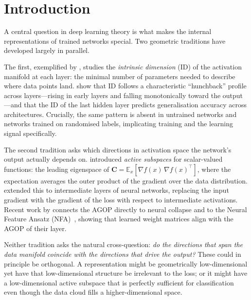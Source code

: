 \documentclass{article}
\newcommand{\E}{\mathbb{E}}
\newcommand{\AGOP}{\mathbf{C}}          %
\begin{document}
\section{Introduction}
\label{sec:intro}

A central question in deep learning theory is what makes the internal
representations of trained networks special.  Two geometric traditions have
developed largely in parallel.

The first, exemplified by \citet{ansuini2019intrinsic}, studies the
\emph{intrinsic dimension} (ID) of the activation manifold at each layer: the
minimal number of parameters needed to describe where data points land.
\citet{ansuini2019intrinsic} show that ID follows a characteristic
``hunchback'' profile across layers---rising in early layers and falling
monotonically toward the output---and that the ID of the last hidden layer
predicts generalisation accuracy across architectures.  Crucially, the same
pattern is absent in untrained networks and networks trained on randomised
labels, implicating training and the learning signal specifically.

The second tradition asks which directions in activation space the network's
output actually depends on.  \citet{constantine2015active} introduced
\emph{active subspaces} for scalar-valued functions: the leading eigenspace of
$\AGOP = \E_x[\nabla f(x)\,\nabla f(x)^\top]$, where the expectation
averages the outer product of the gradient over the data distribution.
\citet{cui2020active} extended this to intermediate layers of neural networks,
replacing the input gradient with the gradient of the loss with respect to
intermediate activations.  Recent work by \citet{beaglehole2024agop} connects
the AGOP directly to neural collapse and to the Neural Feature Ansatz
(NFA)~\citep{beaglehole2024nfa}, showing that learned weight matrices align with the
AGOP of their layer.

Neither tradition asks the natural cross-question: \emph{do the directions
that span the data manifold coincide with the directions that drive the
output?}  These could in principle be orthogonal.  A representation might be
geometrically low-dimensional yet have that low-dimensional structure be
irrelevant to the loss; or it might have a low-dimensional active subspace
that is perfectly sufficient for classification even though the data cloud
fills a higher-dimensional space.
\end{document}
